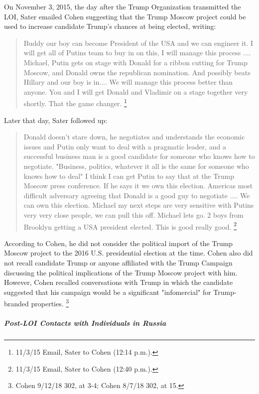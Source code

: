 On November 3, 2015, the day after the Trump Organization transmitted the LOI, Sater emailed Cohen suggesting that the Trump Moscow project could be used to increase candidate Trump's chances at being elected, writing:

\begin{quote}
Buddy our boy can become President of the USA and we can engineer it.
I will get all of Putins team to buy in on this, I will manage this process ....
Michael, Putin gets on stage with Donald for a ribbon cutting for Trump Moscow, and Donald owns the republican nomination.
And possibly beats Hillary and our boy is in....
We will manage this process better than anyone.
You and I will get Donald and Vladimir on a stage together very shortly.
That the game changer.%
\footnote{11/3/15 Email, Sater to Cohen (12:14 p.m.).}
\end{quote}

Later that day, Sater followed up:

\begin{quote}
Donald doesn't stare down, he negotiates and understands the economic issues and Putin only want to deal with a pragmatic leader, and a successful business man is a good candidate for someone who knows how to negotiate.
"Business, politics, whatever it all is the same for someone who knows how to deal"
I think I can get Putin to say that at the Trump Moscow press conference.
If he says it we own this election.
Americas most difficult adversary agreeing that Donald is a good guy to negotiate ....
We can own this election.
Michael my next steps are very sensitive with Putins very very close people, we can pull this off.
Michael lets go.
2 boys from Brooklyn getting a USA president elected.
This is good really good.%
\footnote{11/3/15 Email, Sater to Cohen (12:40 p.m.).}
\end{quote}

According to Cohen, he did not consider the political import of the Trump Moscow project to the 2016 U.S. presidential election at the time.
Cohen also did not recall candidate Trump or anyone affiliated with the Trump Campaign discussing the political implications of the Trump Moscow project with him.
However, Cohen recalled conversations with Trump in which the candidate suggested that his campaign would be a significant "infomercial" for Trump-branded properties.%
\footnote{Cohen 9/12/18 302, at 3-4; Cohen 8/7/18 302, at 15.}

\subparagraph{Post-LOI Contacts with Individuals in Russia}


